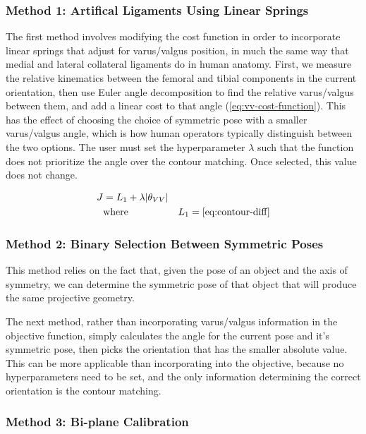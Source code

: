 \subsubsection{Method 1: Artifical Ligaments Using Linear Springs}
The first method involves modifying the cost function in order to incorporate linear springs that adjust for varus/valgus position, in much the same way that medial and lateral collateral ligaments do in human anatomy. First, we measure the relative kinematics between the femoral and tibial components in the current orientation, then use Euler angle decomposition to find the relative varus/valgus between them, and add a linear cost to that angle (\cref{eq:vv-cost-function}). This has the effect of choosing the choice of symmetric pose with a smaller varus/valgus angle, which is how human operators typically distinguish between the two options. The user must set the hyperparameter $\lambda$ such that the function does not prioritize the angle over the contour matching. Once selected, this value does not change.


\begin{equation}
    \begin{aligned}
        J &= L_1 + \lambda|\theta_{VV}| & \\
        & \text{where} & L_1 = \cref{eq:contour-diff}
    \end{aligned}
    \label{eq:vv-cost-function}
\end{equation}

\subsubsection{Method 2: Binary Selection Between Symmetric Poses}
This method relies on the fact that, given the pose of an object and the axis of symmetry, we can determine the symmetric pose of that object that will produce the same projective geometry.

The next method, rather than incorporating varus/valgus information in the objective function, simply calculates the angle for the current pose and it's symmetric pose, then picks the orientation that has the smaller absolute value. This can be more applicable than incorporating into the objective, because no hyperparameters need to be set, and the only information determining the correct orientation is the contour matching.

\subsubsection{Method 3: Bi-plane Calibration}

